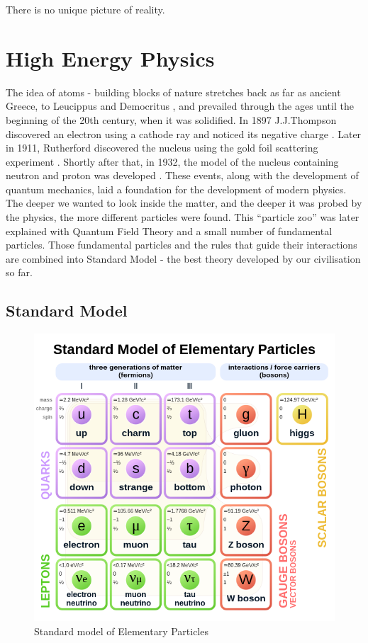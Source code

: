 \begin{savequote}[75mm]
  There is no unique picture of reality.
\end{savequote}

\chapter{High Energy Physics}

The idea of atoms - building blocks of nature stretches back as far as ancient Greece, to Leucippus and Democritus \cite{10.3138/9781442671102}, and prevailed through the ages until the beginning of the 20th century, when it was solidified. In 1897 J.J.Thompson discovered an electron using a cathode ray and noticed its negative charge \cite{thomson1901bodies}.
Later in 1911, Rutherford discovered the nucleus using the gold foil scattering experiment \cite{doi:10.1080/14786440508637080}.
Shortly after that, in 1932, the model of the nucleus containing neutron and proton was developed \cite{Iwanenko1932TheNH, 1932ZPhy...77....1H}.
These events, along with the development of quantum mechanics, laid a foundation for the development of modern physics.
The deeper we wanted to look inside the matter, and the deeper it  was probed by the physics, the more different particles were found.
This ``particle zoo'' was later explained with Quantum Field Theory and a small number of fundamental particles.
Those fundamental particles and the rules that guide their interactions are combined into Standard Model - the best theory developed by our civilisation so far.

\section{Standard Model}

\begin{figure}
  \centering
  \includegraphics[width=0.7\linewidth]{figures/chapter1/Standard_Model_of_Elementary_Particles.svg.png}
  \caption[caption for LOF]{Standard model of Elementary Particles \footnotemark}
  \label{fig:standard_model}
\end{figure}



